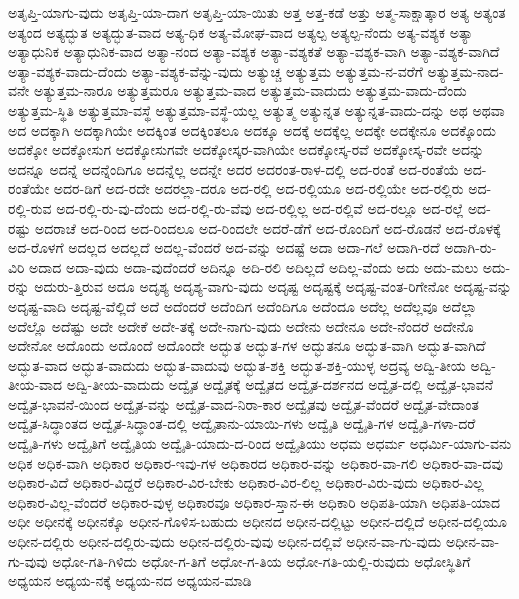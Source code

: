 {ಅತೃಪ್ತಿ-ಯಾಗು-ವುದು
ಅತೃಪ್ತಿ-ಯಾ-ದಾಗ
ಅತೃಪ್ತಿ-ಯಾ-ಯಿತು
ಅತ್ತ
ಅತ್ತ-ಕಡೆ
ಅತ್ತು
ಅತ್ಮ-ಸಾಕ್ಷಾತ್ಕಾರ
ಅತ್ಯ
ಅತ್ಯಂತ
ಅತ್ಯಂದ
ಅತ್ಯದ್ಭುತ
ಅತ್ಯದ್ಭುತ-ವಾದ
ಅತ್ಯ-ಧಿಕ
ಅತ್ಯ-ಮೋಘ-ವಾದ
ಅತ್ಯಲ್ಪ
ಅತ್ಯಲ್ಪ-ನೆಂದು
ಅತ್ಯ-ವಶ್ಯಕ
ಅತ್ಯಾ
ಅತ್ಯಾಧುನಿಕ
ಅತ್ಯಾಧುನಿಕ-ವಾದ
ಅತ್ಯಾ-ನಂದ
ಅತ್ಯಾ-ವಶ್ಯಕ
ಅತ್ಯಾ-ವಶ್ಯಕತೆ
ಅತ್ಯಾ-ವಶ್ಯಕ-ವಾಗಿ
ಅತ್ಯಾ-ವಶ್ಯಕ-ವಾಗಿದೆ
ಅತ್ಯಾ-ವಶ್ಯಕ-ವಾದು-ದೆಂದು
ಅತ್ಯಾ-ವಶ್ಯಕ-ವೆನ್ನು-ವುದು
ಅತ್ಯುಚ್ಚ
ಅತ್ಯುತ್ತಮ
ಅತ್ಯುತ್ತಮ-ನ-ವರೆಗೆ
ಅತ್ಯುತ್ತಮ-ನಾದ-ವನೇ
ಅತ್ಯುತ್ತಮ-ನಾರೂ
ಅತ್ಯುತ್ತಮರೂ
ಅತ್ಯುತ್ತಮ-ವಾದ
ಅತ್ಯುತ್ತಮ-ವಾದುದು
ಅತ್ಯುತ್ತಮ-ವಾದು-ದೆಂದು
ಅತ್ಯುತ್ತಮ-ಸ್ಥಿತಿ
ಅತ್ಯುತ್ತಮಾ-ವಸ್ಥೆ
ಅತ್ಯುತ್ತಮಾ-ವಸ್ಥೆ-ಯಲ್ಲ
ಅತ್ಯುತ್ಮ
ಅತ್ಯುನ್ನತ
ಅತ್ಯುನ್ನತ-ವಾದು-ದನ್ನು
ಅಥ
ಅಥವಾ
ಅದ
ಅದಕ್ಕಾಗಿ
ಅದಕ್ಕಾಗಿಯೇ
ಅದಕ್ಕಿಂತ
ಅದಕ್ಕಿಂತಲೂ
ಅದಕ್ಕೂ
ಅದಕ್ಕೆ
ಅದಕ್ಕೆಲ್ಲ
ಅದಕ್ಕೇ
ಅದಕ್ಕೇನೂ
ಅದಕ್ಕೊಂದು
ಅದಕ್ಕೋ
ಅದಕ್ಕೋಸುಗ
ಅದಕ್ಕೋಸುಗವೇ
ಅದಕ್ಕೋಸ್ಕರ-ವಾಗಿಯೇ
ಅದಕ್ಕೋಸ್ಕ-ರವೆ
ಅದಕ್ಕೋಸ್ಕ-ರವೇ
ಅದನ್ನು
ಅದನ್ನೂ
ಅದನ್ನೆ
ಅದನ್ನೆಂದಿಗೂ
ಅದನ್ನೆಲ್ಲ
ಅದನ್ನೇ
ಅದರ
ಅದರಂತ-ರಾಳ-ದಲ್ಲಿ
ಅದ-ರಂತೆ
ಅದ-ರಂತೆಯೆ
ಅದ-ರಂತೆಯೇ
ಅದರ-ಡಿಗೆ
ಅದ-ರದೇ
ಅದರಲ್ಲಾ-ದರೂ
ಅದ-ರಲ್ಲಿ
ಅದ-ರಲ್ಲಿಯೂ
ಅದ-ರಲ್ಲಿಯೇ
ಅದ-ರಲ್ಲಿರು
ಅದ-ರಲ್ಲಿ-ರುವ
ಅದ-ರಲ್ಲಿ-ರು-ವು-ದೆಂದು
ಅದ-ರಲ್ಲಿ-ರು-ವೆವು
ಅದ-ರಲ್ಲಿಲ್ಲ
ಅದ-ರಲ್ಲಿವೆ
ಅದ-ರಲ್ಲೂ
ಅದ-ರಲ್ಲೆ
ಅದ-ರಷ್ಟು
ಅದರಾಚೆ
ಅದ-ರಿಂದ
ಅದ-ರಿಂದಲೂ
ಅದ-ರಿಂದಲೇ
ಅದರೆ-ಡೆಗೆ
ಅದ-ರೊಂದಿಗೆ
ಅದ-ರೊಡನೆ
ಅದ-ರೊಳಕ್ಕೆ
ಅದ-ರೊಳಗೆ
ಅದಲ್ಲದ
ಅದಲ್ಲದೆ
ಅದಲ್ಲ-ವೆಂದರೆ
ಅದ-ವನ್ನು
ಅದಷ್ಟೆ
ಅದಾ
ಅದಾ-ಗಲೆ
ಅದಾಗಿ-ರದೆ
ಅದಾಗಿ-ರು-ವಿರಿ
ಅದಾದ
ಅದಾ-ವುದು
ಅದಾ-ವುದೆಂದರೆ
ಅದಿನ್ನೂ
ಅದಿ-ರಲಿ
ಅದಿಲ್ಲದೆ
ಅದಿಲ್ಲ-ವೆಂದು
ಅದು
ಅದು-ಮಲು
ಅದು-ರನ್ನು
ಅದುರು-ತ್ತಿರುವ
ಅದೂ
ಅದೃಶ್ಯ
ಅದೃಶ್ಯ-ವಾಗು-ವುದು
ಅದೃಷ್ಟ
ಅದೃಷ್ಟಕ್ಕೆ
ಅದೃಷ್ಟ-ವಂತ-ರಿಗೇನೋ
ಅದೃಷ್ಟ-ವನ್ನು
ಅದೃಷ್ಟ-ವಾದಿ
ಅದೃಷ್ಟ-ವೆಲ್ಲಿದೆ
ಅದೆ
ಅದೆಂದರೆ
ಅದೆಂದಿಗ
ಅದೆಂದಿಗೂ
ಅದೆಂದೂ
ಅದೆಲ್ಲ
ಅದೆಲ್ಲವೂ
ಅದೆಲ್ಲಾ
ಅದೆಲ್ಲೊ
ಅದೆಷ್ಟು
ಅದೇ
ಅದೇಕೆ
ಅದೇ-ತಕ್ಕೆ
ಅದೇ-ನಾಗು-ವುದು
ಅದೇನು
ಅದೇನೂ
ಅದೇ-ನೆಂದರೆ
ಅದೇನೊ
ಅದೇನೋ
ಅದೊಂದು
ಅದೊಂದೆ
ಅದೊಂದೇ
ಅದ್ಭುತ
ಅದ್ಭುತ-ಗಳ
ಅದ್ಭುತನೂ
ಅದ್ಭುತ-ವಾಗಿ
ಅದ್ಭುತ-ವಾಗಿದೆ
ಅದ್ಭುತ-ವಾದ
ಅದ್ಭುತ-ವಾದುದು
ಅದ್ಭುತ-ವಾದುವು
ಅದ್ಭುತ-ಶಕ್ತಿ
ಅದ್ಭುತ-ಶಕ್ತಿ-ಯುಳ್ಳ
ಅದ್ರವ್ಯ
ಅದ್ವಿ-ತೀಯ
ಅದ್ವಿ-ತೀಯ-ವಾದ
ಅದ್ವಿ-ತೀಯ-ವಾದುದು
ಅದ್ವೈತ
ಅದ್ವೈತಕ್ಕೆ
ಅದ್ವೈತದ
ಅದ್ವೈತ-ದರ್ಶನದ
ಅದ್ವೈತ-ದಲ್ಲಿ
ಅದ್ವೈತ-ಭಾವನೆ
ಅದ್ವೈತ-ಭಾವನೆ-ಯಿಂದ
ಅದ್ವೈತ-ವನ್ನು
ಅದ್ವೈತ-ವಾದ-ನಿರಾ-ಕಾರ
ಅದ್ವೈತವು
ಅದ್ವೈತ-ವೆಂದರೆ
ಅದ್ವೈತ-ವೇದಾಂತ
ಅದ್ವೈತ-ಸಿದ್ಧಾಂತದ
ಅದ್ವೈತ-ಸಿದ್ಧಾಂತ-ದಲ್ಲಿ
ಅದ್ವೈತಾನು-ಯಾಯಿ-ಗಳು
ಅದ್ವೈತಿ
ಅದ್ವೈತಿ-ಗಳ
ಅದ್ವೈತಿ-ಗಳಾ-ದರೆ
ಅದ್ವೈತಿ-ಗಳು
ಅದ್ವೈತಿಗೆ
ಅದ್ವೈತಿಯ
ಅದ್ವೈತಿ-ಯಾದು-ದ-ರಿಂದ
ಅದ್ವೈತಿಯು
ಅಧಮ
ಅಧರ್ಮ
ಅಧರ್ಮಿ-ಯಾಗು-ವನು
ಅಧಿಕ
ಅಧಿಕ-ವಾಗಿ
ಅಧಿಕಾರ
ಅಧಿಕಾರ-ಇವು-ಗಳ
ಅಧಿಕಾರದ
ಅಧಿಕಾರ-ವನ್ನು
ಅಧಿಕಾರ-ವಾ-ಗಲಿ
ಅಧಿಕಾರ-ವಾ-ದವು
ಅಧಿಕಾರ-ವಿದೆ
ಅಧಿಕಾರ-ವಿದ್ದರೆ
ಅಧಿಕಾರ-ವಿರ-ಬೇಕು
ಅಧಿಕಾರ-ವಿರ-ಲಿಲ್ಲ
ಅಧಿಕಾರ-ವಿರು-ವುದು
ಅಧಿಕಾರ-ವಿಲ್ಲ
ಅಧಿಕಾರ-ವಿಲ್ಲ-ವೆಂದರೆ
ಅಧಿಕಾರ-ವುಳ್ಳ
ಅಧಿಕಾರವೂ
ಅಧಿಕಾರ-ಸ್ತಾನ-ಈ
ಅಧಿಕಾರಿ
ಅಧಿಪತಿ-ಯಾಗಿ
ಅಧಿಪತಿ-ಯಾದ
ಅಧೀ
ಅಧೀನಕ್ಕೆ
ಅಧೀನಕ್ಕೊ
ಅಧೀನ-ಗೊಳಿಸ-ಬಹುದು
ಅಧೀನದ
ಅಧೀನ-ದಲ್ಲಿಟ್ಟು
ಅಧೀನ-ದಲ್ಲಿದೆ
ಅಧೀನ-ದಲ್ಲಿಯೂ
ಅಧೀನ-ದಲ್ಲಿರು
ಅಧೀನ-ದಲ್ಲಿರು-ವುದು
ಅಧೀನ-ದಲ್ಲಿರು-ವುವು
ಅಧೀನ-ದಲ್ಲಿವೆ
ಅಧೀನ-ವಾ-ಗು-ವುದು
ಅಧೀನ-ವಾ-ಗು-ವುವು
ಅಧೋ-ಗತಿ-ಗಿಳಿದು
ಅಧೋ-ಗ-ತಿಗೆ
ಅಧೋ-ಗ-ತಿಯ
ಅಧೋ-ಗತಿ-ಯಲ್ಲಿ-ರುವುದು
ಅಧೋಸ್ಥಿತಿಗೆ
ಅಧ್ಯಯನ
ಅಧ್ಯಯ-ನಕ್ಕೆ
ಅಧ್ಯಯ-ನದ
ಅಧ್ಯಯನ-ಮಾಡಿ
}
